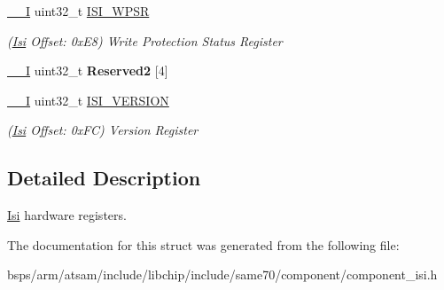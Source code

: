 \begin{DoxyCompactItemize}
\mbox{\label{structIsi_a9d78442d544dad3d62d628a5b19b8309}} 
\mbox{\hyperlink{core__cm7_8h_af63697ed9952cc71e1225efe205f6cd3}{\+\_\+\+\_\+I}} uint32\+\_\+t \mbox{\hyperlink{structIsi_a9d78442d544dad3d62d628a5b19b8309}{I\+S\+I\+\_\+\+W\+P\+SR}}
\begin{DoxyCompactList}\small\item\em (\mbox{\hyperlink{structIsi}{Isi}} Offset\+: 0x\+E8) Write Protection Status Register \end{DoxyCompactList}\item 
\mbox{\label{structIsi_a69bc4c5366b8c607963cad9747ec916e}} 
\mbox{\hyperlink{core__cm7_8h_af63697ed9952cc71e1225efe205f6cd3}{\+\_\+\+\_\+I}} uint32\+\_\+t {\bfseries Reserved2} \mbox{[}4\mbox{]}
\item 
\mbox{\label{structIsi_aa1aa0c41ba5b14edbd22fecb05a7026a}} 
\mbox{\hyperlink{core__cm7_8h_af63697ed9952cc71e1225efe205f6cd3}{\+\_\+\+\_\+I}} uint32\+\_\+t \mbox{\hyperlink{structIsi_aa1aa0c41ba5b14edbd22fecb05a7026a}{I\+S\+I\+\_\+\+V\+E\+R\+S\+I\+ON}}
\begin{DoxyCompactList}\small\item\em (\mbox{\hyperlink{structIsi}{Isi}} Offset\+: 0x\+FC) Version Register \end{DoxyCompactList}\end{DoxyCompactItemize}


\subsection{Detailed Description}
\mbox{\hyperlink{structIsi}{Isi}} hardware registers. 

The documentation for this struct was generated from the following file\+:\begin{DoxyCompactItemize}
\item 
bsps/arm/atsam/include/libchip/include/same70/component/component\+\_\+isi.\+h\end{DoxyCompactItemize}
